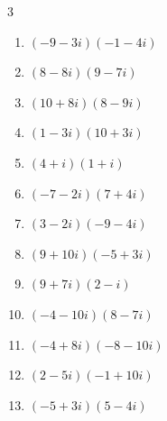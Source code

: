 \begin{multicols}{3}
\begin{enumerate}
  \item $\displaystyle (-9-3i)(-1-4i)$

        \phantom{$\displaystyle =-3+39i$}

  \item $\displaystyle (8-8i)(9-7i)$

        \phantom{$\displaystyle =16-128i$}

  \item $\displaystyle (10+8i)(8-9i)$

        \phantom{$\displaystyle =152-26i$}

  \item $\displaystyle (1-3i)(10+3i)$

        \phantom{$\displaystyle =19-27i$}

\columnbreak %

  \item $\displaystyle (4+i)(1+i)$

        \phantom{$\displaystyle =3+5i$}

  \item $\displaystyle (-7-2i)(7+4i)$

        \phantom{$\displaystyle =-41-42i$}

  \item $\displaystyle (3-2i)(-9-4i)$

        \phantom{$\displaystyle =-35+6i$}

  \item $\displaystyle (9+10i)(-5+3i)$

        \phantom{$\displaystyle =-75-23i$}

  \item $\displaystyle (9+7i)(2-i)$

        \phantom{$\displaystyle =25+5i$}

  \item $\displaystyle (-4-10i)(8-7i)$

        \phantom{$\displaystyle =-102-52i$}

  \item $\displaystyle (-4+8i)(-8-10i)$

        \phantom{$\displaystyle =112-24i$}

  \item $\displaystyle (2-5i)(-1+10i)$

        \phantom{$\displaystyle =48+25i$}

  \item $\displaystyle (-5+3i)(5-4i)$


\end{enumerate}
\end{multicols}
